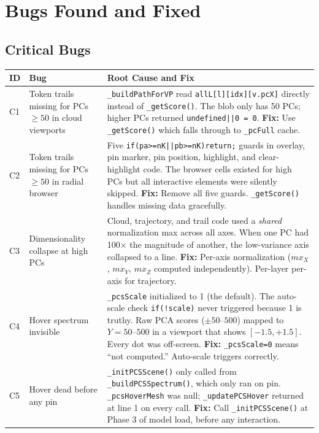 \documentclass[11pt,a4paper]{article}
\begin{document}
\section{Bugs Found and Fixed}

\subsection{Critical Bugs}

\begin{longtable}{p{}p{}p{}}
\toprule
\textbf{ID} & \textbf{Bug} & \textbf{Root Cause and Fix} \\
\midrule
\endhead
C1 & Token trails missing for PCs $\geq 50$ in cloud viewports & \texttt{\_buildPathForVP} read \texttt{allL[l][idx][v.pcX]} directly instead of \texttt{\_getScore()}. The blob only has 50 PCs; higher PCs returned \texttt{undefined||0 = 0}. \textbf{Fix:} Use \texttt{\_getScore()} which falls through to \texttt{\_pcFull} cache. \\
\midrule
C2 & Token trails missing for PCs $\geq 50$ in radial browser & Five \texttt{if(pa>=nK||pb>=nK)return;} guards in overlay, pin marker, pin position, highlight, and clear-highlight code. The browser cells existed for high PCs but all interactive elements were silently skipped. \textbf{Fix:} Remove all five guards. \texttt{\_getScore()} handles missing data gracefully. \\
\midrule
C3 & Dimensionality collapse at high PCs & Cloud, trajectory, and trail code used a \emph{shared} normalization max across all axes. When one PC had 100$\times$ the magnitude of another, the low-variance axis collapsed to a line. \textbf{Fix:} Per-axis normalization ($mx_X$, $mx_Y$, $mx_Z$ computed independently). Per-layer per-axis for trajectory. \\
\midrule
C4 & Hover spectrum invisible & \texttt{\_pcsScale} initialized to 1 (the default). The auto-scale check \texttt{if(!scale)} never triggered because 1 is truthy. Raw PCA scores ($\pm 50$--$500$) mapped to $Y=50$--$500$ in a viewport that shows $[-1.5, +1.5]$. Every dot was off-screen. \textbf{Fix:} \texttt{\_pcsScale=0} means ``not computed.'' Auto-scale triggers correctly. \\
\midrule
C5 & Hover dead before any pin & \texttt{\_initPCSScene()} only called from \texttt{\_buildPCSSpectrum()}, which only ran on pin. \texttt{\_pcsHoverMesh} was null; \texttt{\_updatePCSHover} returned at line 1 on every call. \textbf{Fix:} Call \texttt{\_initPCSScene()} at Phase 3 of model load, before any interaction. \\

\end{longtable}
\end{document}
